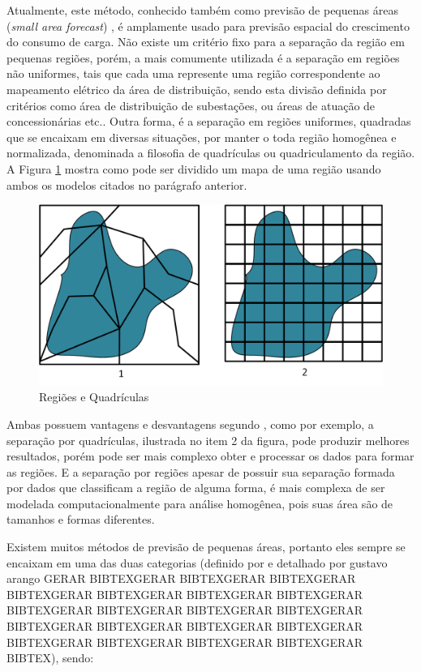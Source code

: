 Atualmente, este método, conhecido também como previsão de pequenas áreas (\emph{small area forecast}) \cite{willis1995spatial}, é amplamente usado para previsão espacial do crescimento do consumo de carga. Não existe um critério fixo para a separação da região em pequenas regiões, porém, a mais comumente utilizada é a separação em regiões não uniformes, tais que cada uma represente uma região correspondente ao mapeamento elétrico da área de distribuição, sendo esta divisão definida por critérios como área de distribuição de subestações, ou áreas de atuação de concessionárias etc.. Outra forma, é a separação em regiões uniformes, quadradas que se encaixam em diversas situações, por manter o toda região homogênea e normalizada, denominada a filosofia de quadrículas ou quadriculamento da região. A Figura \ref{fig:RegionsAndQuadrics} mostra como pode ser dividido um mapa de uma região usando ambos os modelos citados no parágrafo anterior. 

\begin{figure}[h]
	\centering	
	\includegraphics[scale=0.55]{Figuras/RegionsAndQuadrics.png}
	\caption{Regiões e Quadrículas}
	\label{fig:RegionsAndQuadrics}
\end{figure}

Ambas possuem vantagens e desvantagens segundo \citeauthor{willis2002spatial} \cite{willis2002spatial}, como por exemplo, a separação por quadrículas, ilustrada no item 2 da figura, pode produzir melhores resultados, porém pode ser mais complexo obter e processar os dados para formar as regiões. E a separação por regiões apesar de possuir sua separação formada por dados que classificam a região de alguma forma, é mais complexa de ser modelada computacionalmente para análise homogênea, pois suas área são de tamanhos e formas diferentes.

Existem muitos métodos de previsão de pequenas áreas, portanto eles sempre se encaixam em uma das duas categorias (definido por\citeauthor{willis2002spatial} \cite{willis2002spatial} e detalhado por gustavo arango GERAR BIBTEXGERAR BIBTEXGERAR BIBTEXGERAR BIBTEXGERAR BIBTEXGERAR BIBTEXGERAR BIBTEXGERAR BIBTEXGERAR BIBTEXGERAR BIBTEXGERAR BIBTEXGERAR BIBTEXGERAR BIBTEXGERAR BIBTEXGERAR BIBTEXGERAR BIBTEXGERAR BIBTEXGERAR BIBTEXGERAR BIBTEXGERAR BIBTEX), sendo:

